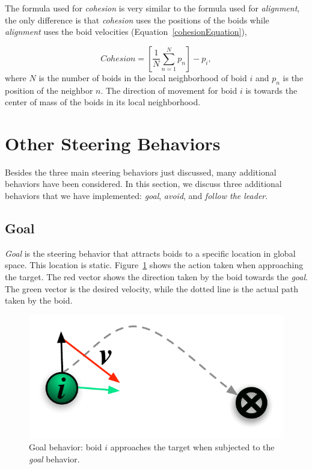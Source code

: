 The formula used for \textit{cohesion} is very similar to the formula used for \textit{alignment}, the only difference is that \textit{cohesion} uses the positions of the boids while \textit{alignment} uses the boid velocities (Equation~\ref{cohesionEquation}),

\begin{equation}
\label{cohesionEquation}
Cohesion = \left[  \frac{1}{N} \sum_{n=1}^{N} p_n \right ] - p_i, 
\end{equation}
where $N$ is the number of boids in the local neighborhood of boid $i$ and $p_n$ is the position of the neighbor $n$. The direction of movement for boid $i$ is towards the center of mass of the boids in its local neighborhood. 

\section{Other Steering Behaviors}\label{otherbehaviors}
Besides the three main steering behaviors just discussed, many additional behaviors have been considered. In this section, we discuss three additional behaviors that we have implemented: \textit{goal}, \textit{avoid}, and \textit{follow the leader}.

\subsection{Goal}
\textit{Goal} is the steering behavior that attracts boids to a specific location in global space. This location is static. Figure~\ref{goalPDF} shows the action taken when approaching the target. The red vector shows the direction taken by the boid towards the \textit{goal}. The green vector is the desired velocity, while the dotted line is the actual path taken by the boid.

\begin{figure}[htbp]
\vspace{16pt}
\begin{center}
\includegraphics[scale=0.95]{figures/goal.pdf}
\caption{Goal behavior: boid $i$ approaches the target when subjected to the \textit{goal} behavior.}
\label{goalPDF}
\end{center}
\end{figure}

